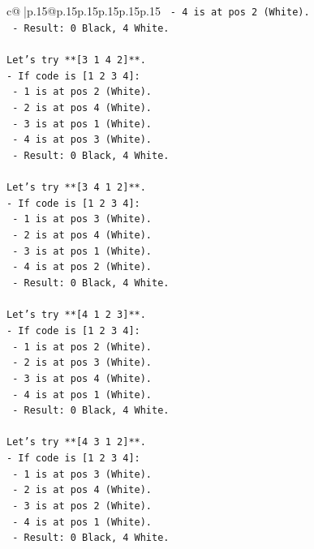 \documentclass{article}
\begin{document}
{\begin{supertabular}{c@{$\;$}|p{.15\linewidth}@{}p{.15\linewidth}p{.15\linewidth}p{.15\linewidth}p{.15\linewidth}p{.15\linewidth}}
{{{\texttt{  {-} 4 is at pos 2 (White).} \\
\texttt{  {-} Result: 0 Black, 4 White.} \\
\\ 
\texttt{Let's try **{[}3 1 4 2{]}**.} \\
\texttt{{-} If code is {[}1 2 3 4{]}:} \\
\texttt{  {-} 1 is at pos 2 (White).} \\
\texttt{  {-} 2 is at pos 4 (White).} \\
\texttt{  {-} 3 is at pos 1 (White).} \\
\texttt{  {-} 4 is at pos 3 (White).} \\
\texttt{  {-} Result: 0 Black, 4 White.} \\
\\ 
\texttt{Let's try **{[}3 4 1 2{]}**.} \\
\texttt{{-} If code is {[}1 2 3 4{]}:} \\
\texttt{  {-} 1 is at pos 3 (White).} \\
\texttt{  {-} 2 is at pos 4 (White).} \\
\texttt{  {-} 3 is at pos 1 (White).} \\
\texttt{  {-} 4 is at pos 2 (White).} \\
\texttt{  {-} Result: 0 Black, 4 White.} \\
\\ 
\texttt{Let's try **{[}4 1 2 3{]}**.} \\
\texttt{{-} If code is {[}1 2 3 4{]}:} \\
\texttt{  {-} 1 is at pos 2 (White).} \\
\texttt{  {-} 2 is at pos 3 (White).} \\
\texttt{  {-} 3 is at pos 4 (White).} \\
\texttt{  {-} 4 is at pos 1 (White).} \\
\texttt{  {-} Result: 0 Black, 4 White.} \\
\\ 
\texttt{Let's try **{[}4 3 1 2{]}**.} \\
\texttt{{-} If code is {[}1 2 3 4{]}:} \\
\texttt{  {-} 1 is at pos 3 (White).} \\
\texttt{  {-} 2 is at pos 4 (White).} \\
\texttt{  {-} 3 is at pos 2 (White).} \\
\texttt{  {-} 4 is at pos 1 (White).} \\
\texttt{  {-} Result: 0 Black, 4 White.} \\
}}}
\end{supertabular}}
\end{document}

